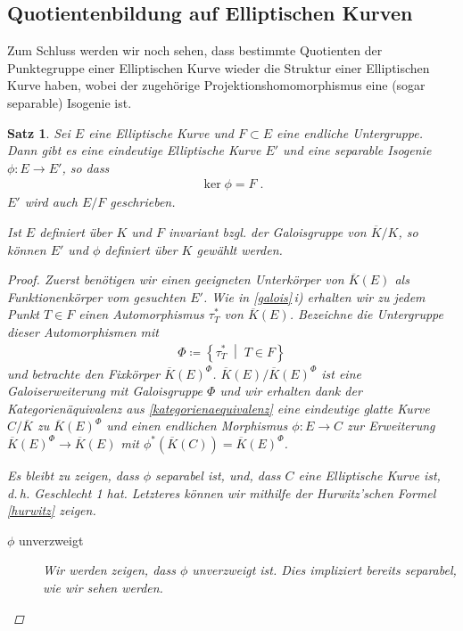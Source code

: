 \documentclass[english, german, parskip=half]{scrartcl}
\newtheorem{Satz}{Satz}[section]
\theoremstyle{definition}
\theoremstyle{remark}
\newcommand*{\K}{\ensuremath{K}} %
\newcommand*{\algK}{\ensuremath{\overline K}} %
\newcommand{\F}{F} %
\begin{document}
\subsection{Quotientenbildung auf Elliptischen Kurven}
Zum Schluss werden wir noch sehen, dass bestimmte Quotienten der
Punktegruppe einer Elliptischen Kurve wieder die Struktur einer
Elliptischen Kurve haben, wobei der zugehörige
Projektionshomomorphismus eine (sogar separable) Isogenie ist.

\begin{Satz}
  Sei $E$ eine Elliptische Kurve und $\F\subset E$ eine endliche
  Untergruppe.
  Dann gibt es eine eindeutige Elliptische Kurve $E'$ und eine
  separable Isogenie $\phi\colon E\to E'$, so dass
  \begin{gather*}
    \ker\phi = \F \;.
  \end{gather*}
  $E'$ wird auch $E/\F$ geschrieben.

  Ist $E$ definiert über $K$ und $\F$ invariant bzgl. der Galoisgruppe
  von $\algK/\K$, so können $E'$ und $\phi$ definiert über $K$ gewählt
  werden.
  \begin{proof}
    Zuerst benötigen wir einen geeigneten Unterkörper von $\algK(E)$
    als Funktionenkörper vom gesuchten $E'$.
    Wie in \autoref{galois}\,\emph{i)} erhalten wir zu jedem Punkt
    $T\in \F$ einen Automorphismus $\tau_T^*$ von $\algK(E)$.
    Bezeichne die Untergruppe dieser Automorphismen mit 
    \begin{gather*}
      \Phi\coloneqq\left\{ \tau_T^* \;\middle|\; T\in \F \right\}
    \end{gather*}
    und betrachte den Fixkörper $\algK(E)^\Phi$.    
    $\algK(E)/\algK(E)^\Phi$ ist eine Galoiserweiterung mit
    Galoisgruppe $\Phi$ und wir erhalten dank der Kategorienäquivalenz
    aus \autoref{kategorienaequivalenz} eine eindeutige glatte Kurve
    $C/\algK$ zu $\algK(E)^\Phi$ und einen endlichen Morphismus
    $\phi\colon E\to C$ zur Erweiterung $\algK(E)^\Phi\to\algK(E)$
    mit $\phi^*(\algK(C))=\algK(E)^\Phi$.
    
    Es bleibt zu zeigen, dass $\phi$ separabel ist, und, dass $C$ eine
    Elliptische Kurve ist, d.\,h. Geschlecht 1 hat.
    Letzteres können wir mithilfe der Hurwitz'schen Formel
    \autoref{hurwitz} zeigen.

    \begin{description}
    \item[$\phi$ unverzweigt]
      Wir werden zeigen, dass $\phi$ unverzweigt ist. Dies impliziert
      bereits separabel, wie wir sehen werden.


\end{description}
\end{proof}
\end{Satz}
\end{document}
